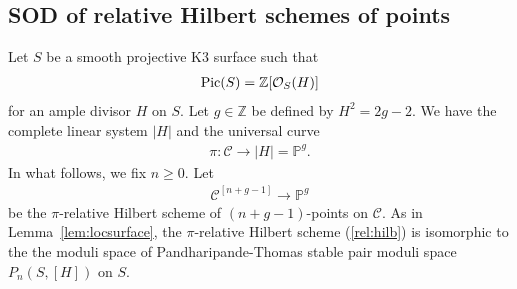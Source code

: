 \documentclass[11pt]{amsart}
\theoremstyle{plain}
\newcommand{\cC}{\mathcal{C}}
\newcommand{\oO}{\mathcal{O}}
\newcommand{\Pic}{\mathop{\rm Pic}\nolimits}
\begin{document}
\subsection{SOD of relative Hilbert schemes of points}
Let $S$ be a smooth projective K3 surface such that
\begin{align*}
\Pic(S)=\mathbb{Z}[\oO_S(H)]
\end{align*}
for an ample divisor $H$ on $S$. 
Let $g \in \mathbb{Z}$ be 
defined by $H^2=2g-2$. 
We have the complete linear system
$\vert H \rvert$ and the universal curve
\begin{align*}
\pi \colon 
\cC \to 
\lvert H \rvert=\mathbb{P}^g.
\end{align*}
In what follows, we fix 
$n \ge 0$. Let 
\begin{align}\label{rel:hilb}
\cC^{[n+g-1]}
\to \mathbb{P}^g
\end{align}
be the $\pi$-relative Hilbert scheme of $(n+g-1)$-points on $\cC$. 
As in Lemma~\ref{lem:locsurface}, 
the $\pi$-relative Hilbert scheme (\ref{rel:hilb})
is isomorphic to the 
the moduli space of Pandharipande-Thomas stable 
pair moduli space $P_n(S, [H])$ on $S$. 
\end{document}
